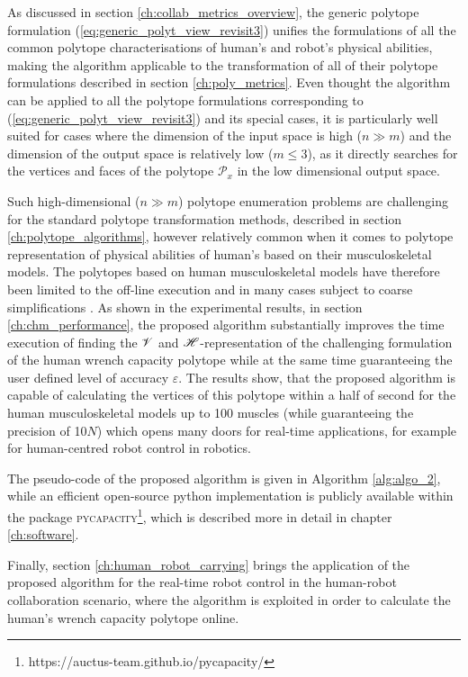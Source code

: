 As discussed in section \ref{ch:collab_metrics_overview}, the generic polytope formulation (\ref{eq:generic_polyt_view_revisit3}) unifies the formulations of all the common polytope characterisations of human's and robot's physical abilities, making the algorithm applicable to the transformation of all of their polytope formulations described in section \ref{ch:poly_metrics}. Even thought the algorithm can be applied to all the polytope formulations corresponding to (\ref{eq:generic_polyt_view_revisit3}) and its special cases, it is particularly well suited for cases where the dimension of the input space is high ($n\gg m$) and the dimension of the output space is relatively low ($m\leq3$), as it directly searches for the vertices and faces of the polytope $\mathcal{P}_x$ in the low dimensional output space. 

Such high-dimensional ($n\gg m$) polytope enumeration problems are challenging for the standard polytope transformation methods, described in section \ref{ch:polytope_algorithms}, however relatively common when it comes to polytope representation of physical abilities of human's based on their musculoskeletal models. The polytopes based on human musculoskeletal models have therefore been limited to the off-line execution \cite{biomechanics1010008} and in many cases subject to coarse simplifications \cite{carmichael_estimating_2013}. As shown in the experimental results, in section \ref{ch:chm_performance}, the proposed algorithm substantially improves the time execution of finding the $\mathscr{V}$ and $\mathscr{H}$-representation of the challenging formulation of the human wrench capacity polytope while at the same time guaranteeing the user defined level of accuracy $\varepsilon$. The results show, that the proposed algorithm is capable of calculating the vertices of this polytope within a half of second for the human musculoskeletal models up to 100 muscles (while guaranteeing the precision of 10$N$) which opens many doors for real-time applications, for example for human-centred robot control in robotics. 

The pseudo-code of the proposed algorithm is given in Algorithm \ref{alg:algo_2}, while an efficient open-source python implementation is publicly available within the package \textsc{pycapacity}\footnote{https://auctus-team.github.io/pycapacity/}, which is described more in detail in chapter \ref{ch:software}.

Finally, section \ref{ch:human_robot_carrying} brings the application of the proposed algorithm for the real-time robot control in the human-robot collaboration scenario, where the algorithm is exploited in order to calculate the human's wrench capacity polytope online. 

